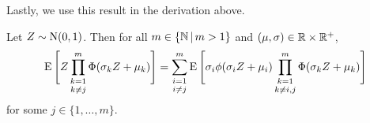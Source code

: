 %
%

Lastly, we use this result in the derivation above.
\begin{lemma}\label{lem:EZgZ}
  Let $Z \sim \operatorname{N}(0,1)$. Then for all $m \in \{\mathbb{N} \, | \, m > 1\}$ and $(\mu, \sigma) \in \mathbb{R} \times \mathbb{R}^+$, 
  \[
    \operatorname{E} \Bigg[ Z \mathop{\prod_{k=1}^m}_{k \neq j} \Phi(\sigma_k Z + \mu_k) \Bigg]
    = \mathop{\sum_{i=1}^m}_{i \neq j} \operatorname{E} \Bigg[ \sigma_i \phi(\sigma_i Z + \mu_i) \mathop{\prod_{k=1}^m}_{k \neq i,j} \Phi (\sigma_k Z + \mu_k) \Bigg]
  \]
  for some $j \in \{1, \dots, m\}$.
\end{lemma}

